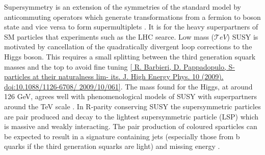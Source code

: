 Supersymmetry is an extension of the symmetries of the standard model by anticommuting operators which generate transformations from a fermion to boson state and vice versa to form supermultiplets \cite{susyintro}. It is for the heavy superpartners of SM particles that experiments such as the LHC searce. Low mass ($\mathcal TeV$) SUSY is motivated by cancellation of the quadratically divergent loop corrections to the Higgs boson. This requires a small splitting between the third generation squark masses and the top to avoid fine tuning \ref{ R. Barbieri, D. Pappadopulo, S-particles at their naturalness lim- its. J. High Energy Phys. 10 (2009). doi:10.1088/1126-6708/ 2009/10/061}. The mass found for the Higgs, at around 126 GeV, agrees well with phenomenological models of SUSY with superpartners around the TeV scale \cite{susyhiggs}. In R-parity conserving SUSY \cite{susywimp} the supersymmetric particles are pair produced and decay to the lightest supersymmetric particle (LSP) which is massive and weakly interacting. The pair production of coloured sparticles can be expected to result in a signature containing jets (especially those from b quarks if the third generation squarks are light) and missing energy \met.









